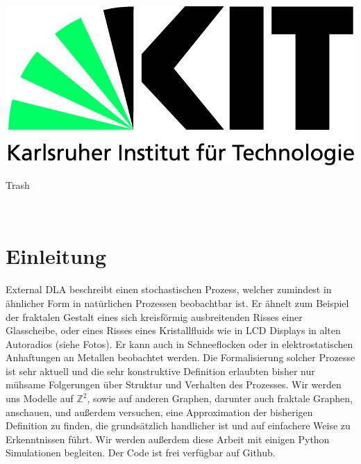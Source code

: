 \documentclass[12pt,a4paper]{scrartcl}
\numberwithin{equation}{subsection}
\numberwithin{equation}{section}
\theoremstyle{definition}
\begin{document}
	\pagestyle{empty}

\begin{titlepage}

	\includegraphics[scale=0.45]{kit-logo.jpg} 
    \vspace*{2cm} 
\begin{center} \large 
    
   Trash
\end{center}
\end{titlepage}

\newpage

\newpage
\phantom \\
\newpage

\tableofcontents %

 	\pagestyle{headings}

\setcounter{page}{1}

\newpage
\section{Einleitung}
External DLA beschreibt einen stochastischen Prozess, welcher zumindest in ähnlicher Form in natürlichen Prozessen beobachtbar ist. Er ähnelt zum Beispiel der fraktalen Gestalt eines sich kreisförmig ausbreitenden Risses einer Glasscheibe, oder eines Risses eines Kristallfluids wie in LCD Displays in alten Autoradios (siehe Fotos). Er kann auch in Schneeflocken oder in elektrostatischen Anhaftungen an Metallen beobachtet werden. Die Formalisierung solcher Prozesse ist sehr aktuell und die sehr konstruktive Definition erlaubten bisher nur mühsame Folgerungen über Struktur und Verhalten des Prozesses. Wir werden uns Modelle auf $\mathbb{Z}^2$, sowie auf anderen Graphen, darunter auch fraktale Graphen, anschauen, und außerdem versuchen, eine Approximation der bisherigen Definition zu finden, die grundsätzlich handlicher ist und auf einfachere Weise zu Erkenntnissen führt. Wir werden außerdem diese Arbeit mit einigen Python Simulationen begleiten. Der Code ist frei verfügbar auf Github. \\
\\
\end{document}
